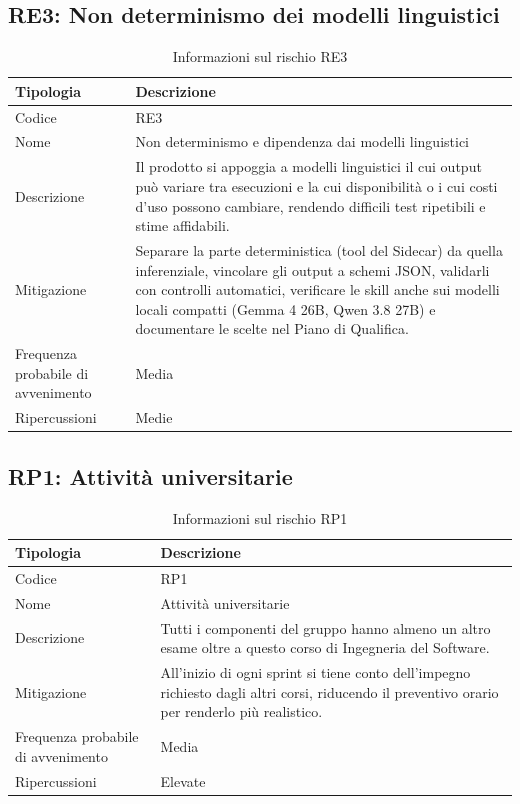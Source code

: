\documentclass[a4paper, 11pt]{article}
\begin{document}
\subsection{RE3: Non determinismo dei modelli linguistici}
\begin{table}[H]
\centering
\begin{tabularx}{\textwidth}{|l|X|}
    \hline
    \textbf{Tipologia} & \textbf{Descrizione} \\ \hline
    Codice & RE3 \\ \hline
    Nome & Non determinismo e dipendenza dai modelli linguistici \\ \hline
    Descrizione & Il prodotto si appoggia a modelli linguistici il cui output può variare tra esecuzioni e la cui disponibilità o i cui costi d'uso possono cambiare, rendendo difficili test ripetibili e stime affidabili. \\ \hline
    Mitigazione & Separare la parte deterministica (tool del Sidecar) da quella inferenziale, vincolare gli output a schemi JSON, validarli con controlli automatici, verificare le skill anche sui modelli locali compatti (Gemma 4 26B, Qwen 3.8 27B) e documentare le scelte nel Piano di Qualifica. \\ \hline
    Frequenza probabile di avvenimento & Media \\ \hline
    Ripercussioni & Medie \\ \hline
\end{tabularx}
\caption{Informazioni sul rischio RE3}
\end{table}

\subsection{RP1: Attività universitarie}
\begin{table}[H]
\centering
\begin{tabularx}{\textwidth}{|l|X|}
    \hline
    \textbf{Tipologia} & \textbf{Descrizione} \\ \hline
    Codice & RP1 \\ \hline
    Nome & Attività universitarie \\ \hline
    Descrizione & Tutti i componenti del gruppo hanno almeno un altro esame oltre a questo corso di Ingegneria del Software. \\ \hline
    Mitigazione & All'inizio di ogni sprint si tiene conto dell'impegno richiesto dagli altri corsi, riducendo il preventivo orario per renderlo più realistico. \\ \hline
    Frequenza probabile di avvenimento & Media \\ \hline
    Ripercussioni & Elevate \\ \hline
\end{tabularx}
\caption{Informazioni sul rischio RP1}
\end{table}
\end{document}
